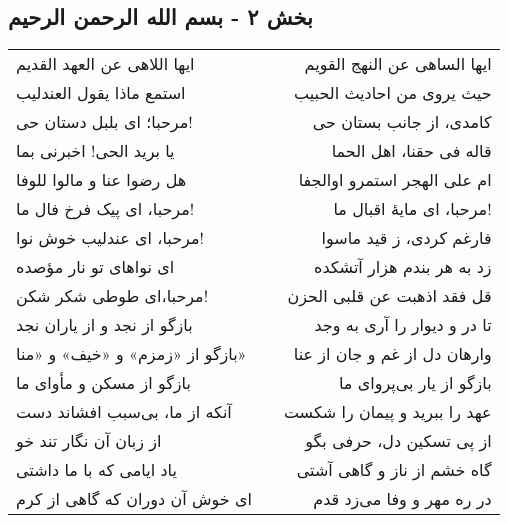 \begin{center}
\section*{بخش ۲ - بسم الله الرحمن الرحیم}
\label{sec:002}
\begin{longtable}{l p{0.5cm} r}
ایها اللاهی عن العهد القدیم
&&
ایها الساهی عن النهج القویم
\\
استمع ماذا یقول العندلیب
&&
حیث یروی من احادیث الحبیب
\\
مرحبا؛ ای بلبل دستان حی!
&&
کامدی، از جانب بستان حی
\\
یا برید الحی! اخبرنی بما
&&
قاله فی حقنا، اهل الحما
\\
هل رضوا عنا و مالوا للوفا
&&
ام علی الهجر استمرو اوالجفا
\\
مرحبا، ای پیک فرخ فال ما!
&&
مرحبا، ای مایهٔ اقبال ما!
\\
مرحبا، ای عندلیب خوش نوا!
&&
فارغم کردی، ز قید ماسوا
\\
ای نواهای تو نار مؤصده
&&
زد به هر بندم هزار آتشکده
\\
مرحبا،ای طوطی شکر شکن!
&&
قل فقد اذهبت عن قلبی الحزن
\\
بازگو از نجد و از یاران نجد
&&
تا در و دیوار را آری به وجد
\\
بازگو از «زمزم» و «خیف» و «منا»
&&
وارهان دل از غم و جان از عنا
\\
بازگو از مسکن و مأوای ما
&&
بازگو از یار بی‌پروای ما
\\
آنکه از ما، بی‌سبب افشاند دست
&&
عهد را ببرید و پیمان را شکست
\\
از زبان آن نگار تند خو
&&
از پی تسکین دل، حرفی بگو
\\
یاد ایامی که با ما داشتی
&&
گاه خشم از ناز و گاهی آشتی
\\
ای خوش آن دوران که گاهی از کرم
&&
در ره مهر و وفا می‌زد قدم
\\
\end{longtable}
\end{center}
